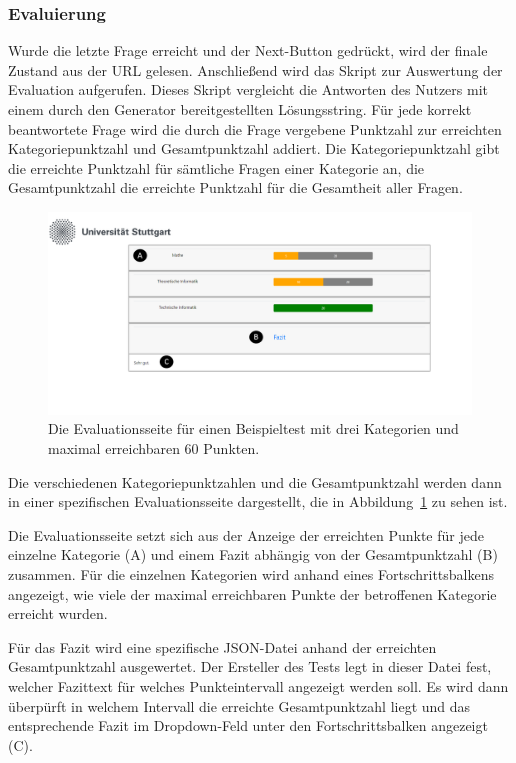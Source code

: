 \subsubsection{Evaluierung}

Wurde die letzte Frage erreicht und der Next-Button gedrückt, wird der finale Zustand aus der URL gelesen.
Anschließend wird das Skript zur Auswertung der Evaluation aufgerufen. 
Dieses Skript vergleicht die Antworten des Nutzers mit einem durch den Generator bereitgestellten Lösungsstring.
Für jede korrekt beantwortete Frage wird die durch die Frage vergebene Punktzahl zur erreichten Kategoriepunktzahl und Gesamtpunktzahl addiert.
Die Kategoriepunktzahl gibt die erreichte Punktzahl für sämtliche Fragen einer Kategorie an, die Gesamtpunktzahl die erreichte Punktzahl für die Gesamtheit aller Fragen.

 \begin{figure} 
  \centering
     \includegraphics[width=\textwidth]{Jena_Images/eval.png}
  \caption{Die Evaluationsseite für einen Beispieltest mit drei Kategorien und maximal erreichbaren 60 Punkten.}
  \label{fig:eval}
\end{figure}
Die verschiedenen Kategoriepunktzahlen und die Gesamtpunktzahl werden dann in einer spezifischen Evaluationsseite dargestellt, die in Abbildung~\ref{fig:eval} zu sehen ist.
  
Die Evaluationsseite setzt sich aus der Anzeige der erreichten Punkte für jede einzelne Kategorie (A) und einem Fazit abhängig von der Gesamtpunktzahl (B) zusammen.
Für die einzelnen Kategorien wird anhand eines Fortschrittsbalkens angezeigt, wie viele der maximal erreichbaren Punkte der betroffenen Kategorie erreicht wurden. 

Für das Fazit wird eine spezifische JSON-Datei anhand der erreichten Gesamtpunktzahl ausgewertet. 
Der Ersteller des Tests legt in dieser Datei fest, welcher Fazittext für welches Punkteintervall angezeigt werden soll. 
Es wird dann überpürft in welchem Intervall die erreichte Gesamtpunktzahl liegt und das entsprechende Fazit im Dropdown-Feld unter den Fortschrittsbalken angezeigt (C). 
